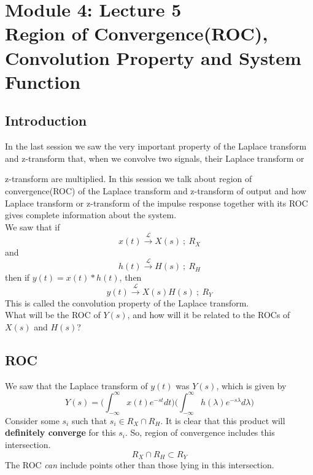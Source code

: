 \section{Module 4: Lecture 5\\Region of Convergence(ROC), Convolution Property and System Function}


\subsection{Introduction}
In the last session we saw the very important property of the Laplace transform and z-transform that, when we convolve two signals, their Laplace transform or {z-transform are multiplied. In this session we talk about region of convergence(ROC) of the Laplace transform and z-transform of output and how Laplace transform or z-transform of the impulse response together with its ROC gives complete information about the system.  \\
We saw that if
\[
x(t) \xrightarrow{\ \mathcal{L}\ } X(s)\ ;\ R_X
\]
and 
\[
h(t) \xrightarrow{\ \mathcal{L}\ } H(s)\ ;\ R_H
\] then if $y(t)= x(t)*h(t)$, then
\[
y(t) \xrightarrow{\ \mathcal{L}\ } X(s)H(s)\ ;\ R_Y
\]
This is called the convolution property of the Laplace transform.\\
What will be the ROC of $Y(s)$, and how will it be related to the ROCs of $X(s)$ and $H(s)$?

\subsection{ROC}
We saw that the Laplace transform of $y(t)$ was $Y(s)$, which is given by 
\[
Y(s)= \Big(\int_{-\infty}^{\infty}{x(t)e^{-st}dt}\Big)\Big(\int_{-\infty}^{\infty}{h(\lambda)e^{-s\lambda}d\lambda}\Big)
\]
Consider some $s_i$ such that $s_i \in R_X \cap R_H $. It is clear that this product will \textbf{definitely converge} for this $s_i$. So, region of convergence includes this intersection. \[ R_X \cap R_H \subset R_Y \] The ROC \emph{can} include points other than those lying in this intersection. 
}
